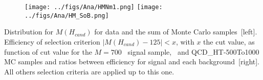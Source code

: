 \begin{frame}{}
\vspace{-.2cm}

\begin{figure}[!Hhtbp]
  \begin{center}
    \texttt{[image: ../figs/Ana/HMNm1.png]}
    \texttt{[image: ../figs/Ana/HM\_SoB.png]}
  \end{center}
\end{figure}

\vspace{-.2cm}
    \begin{block}{}
      \tiny \centering Distribution for $M(H_{cand})$ for data and the sum of Monte Carlo samples~[left]. Efficiency of selection criterion $|M(H_{cand})-125|<x$, with $x$ the cut value, as function of cut value for the $M=700$ \GeVcc~signal sample, \ttbar~and QCD\_HT-500To1000 MC samples and ratios between efficiency for signal and each background~[right]. All others selection criteria are applied up to this one.
    \end{block}

\end{frame}


